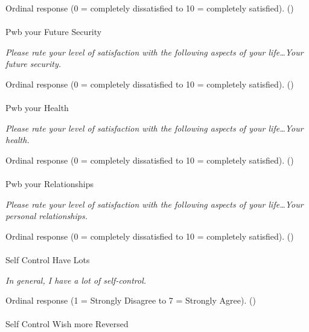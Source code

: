 \documentclass[
  single column]{article}
\makeatletter
\let\oldparagraph\paragraph
\renewcommand{\paragraph}{
    \@ifstar
      \xxxParagraphStar
      \xxxParagraphNoStar
  }
\newcommand{\xxxParagraphStar}[1]{\oldparagraph*{#1}\mbox{}}
\newcommand{\xxxParagraphNoStar}[1]{\oldparagraph{#1}\mbox{}}
\makeatother
\begin{document}
Ordinal response (0 = completely dissatisfied to 10 = completely
satisfied). ()

\paragraph{Pwb your Future Security}\label{pwb-your-future-security}

\emph{Please rate your level of satisfaction with the following aspects
of your life\ldots Your future security.}

Ordinal response (0 = completely dissatisfied to 10 = completely
satisfied). ()

\paragraph{Pwb your Health}\label{pwb-your-health}

\emph{Please rate your level of satisfaction with the following aspects
of your life\ldots Your health.}

Ordinal response (0 = completely dissatisfied to 10 = completely
satisfied). ()

\paragraph{Pwb your Relationships}\label{pwb-your-relationships}

\emph{Please rate your level of satisfaction with the following aspects
of your life\ldots Your personal relationships.}

Ordinal response (0 = completely dissatisfied to 10 = completely
satisfied). ()

\paragraph{Self Control Have Lots}\label{self-control-have-lots}

\emph{In general, I have a lot of self-control.}

Ordinal response (1 = Strongly Disagree to 7 = Strongly Agree).
()

\paragraph{Self Control Wish more
Reversed}\label{self-control-wish-more-reversed}
\end{document}
